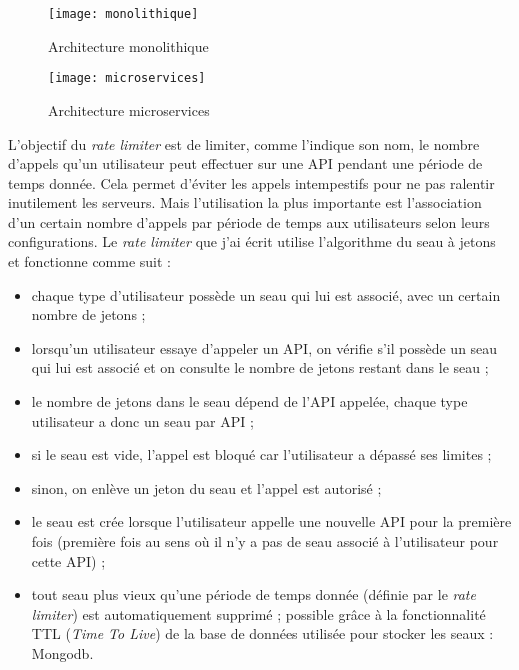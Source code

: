 \begin{figure}[!h]
\centering
\texttt{[image: monolithique]}
\caption{Architecture monolithique}
\end{figure}

\begin{figure}[!h]
\centering
\texttt{[image: microservices]}
\caption{Architecture microservices}
\end{figure}

\vspace{3mm}

L'objectif du \textit{rate limiter} est de limiter, comme l'indique son nom, le nombre d'appels qu'un utilisateur peut effectuer sur une API pendant une période de temps donnée. Cela permet d'éviter les appels intempestifs pour ne pas ralentir inutilement les serveurs. Mais l'utilisation la plus importante est l'association d'un certain nombre d'appels par période de temps aux utilisateurs selon leurs configurations. Le \textit{rate limiter} que j'ai écrit utilise l'algorithme du seau à jetons et fonctionne comme suit :
\begin{itemize}[font=\color{blue}, label=]
  \item chaque type d'utilisateur possède un seau qui lui est associé, avec un certain nombre de jetons ;
  \item lorsqu'un utilisateur essaye d'appeler un API, on vérifie s'il possède un seau qui lui est associé et on consulte le nombre de jetons restant dans le seau ;
  \item le nombre de jetons dans le seau dépend de l'API appelée, chaque type utilisateur a donc un seau par API ;
  \item si le seau est vide, l'appel est bloqué car l'utilisateur a dépassé ses limites ;
  \item sinon, on enlève un jeton du seau et l'appel est autorisé ;
  \item le seau est crée lorsque l'utilisateur appelle une nouvelle API pour la première fois (première fois au sens où il n'y a pas de seau associé à l'utilisateur pour cette API) ;
  \item tout seau plus vieux qu'une période de temps donnée (définie par le \textit{rate limiter}) est automatiquement supprimé ; possible grâce à la fonctionnalité TTL (\textit{Time To Live}) de la base de données utilisée pour stocker les seaux : Mongodb.
\end{itemize}

\vspace{3mm}

